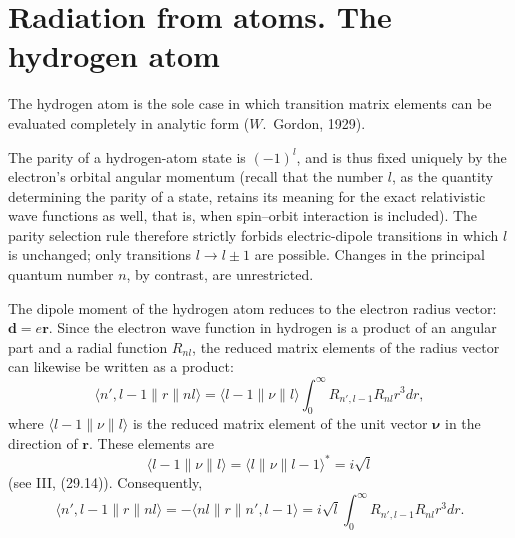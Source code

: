 \section{Radiation from atoms. The hydrogen atom}

The hydrogen atom is the sole case in which transition matrix elements can be evaluated completely in analytic form ($W$.~Gordon, 1929).

The parity of a hydrogen-atom state is $(-1)^l$, and is thus fixed uniquely by the electron's orbital angular momentum (recall that the number $l$, as the quantity determining the parity of a state, retains its meaning for the exact relativistic wave functions as well, that is, when spin--orbit interaction is included). The parity selection rule therefore strictly forbids electric-dipole transitions in which $l$ is unchanged; only transitions $l\to l\pm1$ are possible. Changes in the principal quantum number $n$, by contrast, are unrestricted.

The dipole moment of the hydrogen atom reduces to the electron radius vector: $\mathbf d=e\mathbf r$. Since the electron wave function in hydrogen is a product of an angular part and a radial function $R_{nl}$, the reduced matrix elements of the radius vector can likewise be written as a product:
\[
\langle n',l-1\|r\|nl\rangle
=\langle l-1\|\nu\|l\rangle\int_0^\infty R_{n',l-1}R_{nl}r^3dr,
\]
where $\langle l-1\|\nu\|l\rangle$ is the reduced matrix element of the unit vector $\boldsymbol\nu$ in the direction of $\mathbf r$. These elements are
\[
\langle l-1\|\nu\|l\rangle=\langle l\|\nu\|l-1\rangle^*=i\sqrt l
\]
(see III, (29.14)). Consequently,
\begin{equation}
\langle n',l-1\|r\|nl\rangle
=-\langle nl\|r\|n',l-1\rangle
=i\sqrt l\int_0^\infty R_{n',l-1}R_{nl}r^3dr.
\tag{52.1}
\end{equation}

